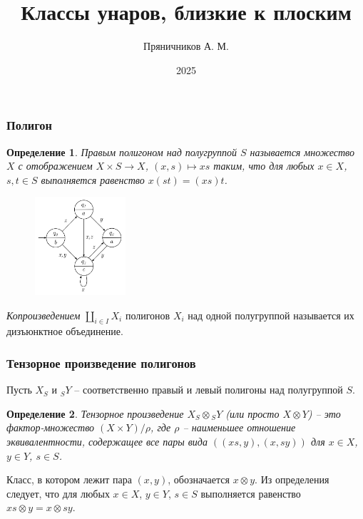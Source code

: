 \documentclass[11pt, notheorems]{beamer}
\title{Классы унаров, близкие к плоским}
\author{Пряничников А. М.}
\date{2025}
\newtheorem{definition}{Определение}
\begin{document}
\frame{\titlepage}

\begin{frame}
	\frametitle{Полигон}

	\begin{definition}
		Правым \textit{полигоном} над полугруппой $S$ называется множество $X$ с отображением $ X \times S \rightarrow X $, $(x, s) \mapsto xs $ таким, что для любых $x \in X$, $s, t \in S$ выполняется равенство $ x (st) = (xs)t $.
	\end{definition}

	\begin{figure}
		\center
		\includegraphics[width=0.3\textwidth]{MooreMachine}
	\end{figure}

	\textit{Копроизведением} $\coprod_{i \in I} X_i$ полигонов $X_i$ над одной полугруппой называется их дизъюнктное объединение.
\end{frame}

\begin{frame}
	\frametitle{Тензорное произведение полигонов}

	Пусть $X_S$ и ${}_{S}Y$ -- соответственно правый и левый полигоны над полугруппой $S$.

	\begin{definition}
		\textit{Тензорное произведение} $X_S \otimes {}_{S}Y$ (или просто $X \otimes Y$) -- это фактор-множество $(X \times Y) / \rho$, где $\rho$ -- наименьшее отношение эквивалентности, содержащее все пары вида $((xs, y),(x, sy))$ для $x \in X$, $y \in Y$, $s \in S$.
	\end{definition}

	Класс, в котором лежит пара $(x, y)$, обозначается $x \otimes y$.
	Из определения следует, что для любых $x \in X$, $y \in Y$, $s \in S$ выполняется равенство $ xs \otimes y = x \otimes sy$.

\end{frame}
\end{document}
